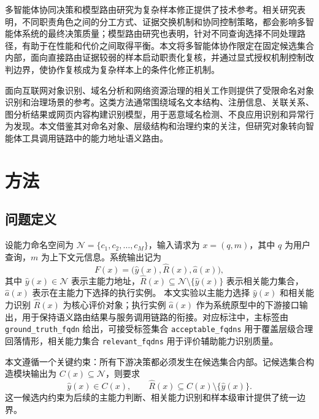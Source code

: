 \documentclass[10pt,a4paper,twocolumn,fontset=fandol]{ctexart}
\begin{document}
多智能体协同决策和模型路由研究为复杂样本修正提供了技术参考\cite{debate,bounds}。相关研究表明，不同职责角色之间的分工方式、证据交换机制和协同控制策略，都会影响多智能体系统的最终决策质量；模型路由研究也表明，针对不同查询选择不同处理路径，有助于在性能和代价之间取得平衡。本文将多智能体协作限定在固定候选集合内部，面向直接路由证据较弱的样本启动职责化复核，并通过显式授权机制控制改判边界，使协作复核成为复杂样本上的条件化修正机制。

面向互联网对象识别、域名分析和网络资源治理的相关工作则提供了受限命名对象识别和治理场景的参考\cite{fan2022survey,hu2024domain,shang2022verify,zhang2016lightweight,zang2018agd,liu2022graph,zhang2021association,hao2016predator}。这类方法通常围绕域名文本结构、注册信息、关联关系、图分析结果或网页内容构建识别模型，用于恶意域名检测、不良应用识别和异常行为发现。本文借鉴其对命名对象、层级结构和治理约束的关注，但研究对象转向智能体工具调用链路中的能力地址语义路由。

\section{方法}

\subsection{问题定义}

设能力命名空间为 $\mathcal{N}=\{c_1,c_2,\ldots,c_M\}$，输入请求为 $x=(q,m)$，其中 $q$ 为用户查询，$m$ 为上下文元信息。系统输出记为
\begin{equation}
F(x)=\bigl(\hat y(x),\hat R(x),\hat a(x)\bigr),
\end{equation}
其中 $\hat y(x)\in \mathcal{N}$ 表示主能力地址，$\hat R(x)\subseteq \mathcal{N}\setminus\{\hat y(x)\}$ 表示相关能力集合，$\hat a(x)$ 表示在主能力下选择的执行实例。
本文实验以主能力选择 $\hat y(x)$ 和相关能力识别 $\hat R(x)$ 为核心评价对象；执行实例 $\hat a(x)$ 作为系统原型中的下游接口输出，用于保持语义路由结果与服务调用链路的衔接。对应标注中，主标签由 \texttt{ground\_truth\_fqdn} 给出，可接受标签集合 \texttt{acceptable\_fqdns} 用于覆盖层级合理回落情形，相关能力集合 \texttt{relevant\_fqdns} 用于评价辅助能力识别质量。

本文遵循一个关键约束：所有下游决策都必须发生在候选集合内部。记候选集合构造模块输出为 $C(x)\subseteq\mathcal{N}$，则要求
\begin{equation}
\hat y(x)\in C(x),\qquad \hat R(x)\subseteq C(x)\setminus\{\hat y(x)\}.
\end{equation}
这一候选内约束为后续的主能力判断、相关能力识别和样本级审计提供了统一边界。
\end{document}

